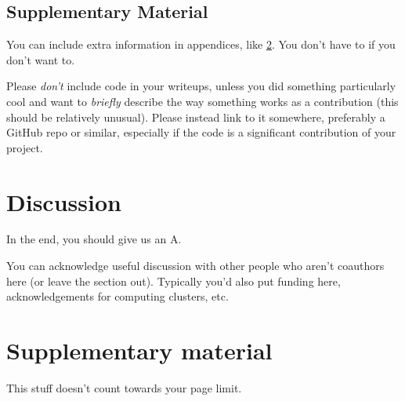 \documentclass{article}
\begin{document}
\subsection{Supplementary Material}
You can include extra information in appendices, like \cref{app:info}.
You don't have to if you don't want to.

Please \emph{don't} include code in your writeups, unless you did something particularly cool and want to \emph{briefly} describe the way something works as a contribution (this should be relatively unusual).
Please instead link to it somewhere, preferably a GitHub repo or similar,
especially if the code is a significant contribution of your project.


\section{Discussion}
In the end, you should give us an A.


\begin{ack}
    You can acknowledge useful discussion with other people who aren't coauthors here (or leave the section out).
    Typically you'd also put funding here, acknowledgements for computing clusters, etc.
\end{ack}


\printbibliography

% 
% 



\appendix

\section{Supplementary material} \label{app:info}

This stuff doesn't count towards your page limit.
\end{document}
